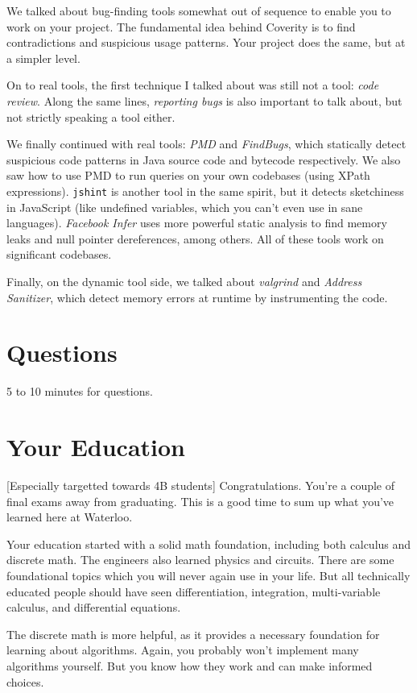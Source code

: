 \documentclass[11pt]{article}
\begin{document}
We talked about bug-finding tools somewhat out of sequence to enable
you to work on your project.  The fundamental idea behind Coverity is
to find contradictions and suspicious usage patterns. Your project
does the same, but at a simpler level.

On to real tools, the first technique I talked about was still not a tool:
\emph{code review}. Along the same lines, \emph{reporting bugs} is also important
to talk about, but not strictly speaking a tool either.

We finally continued with real tools: \emph{PMD} and \emph{FindBugs},
which statically detect suspicious code patterns in Java source code
and bytecode respectively. We also saw how to use PMD to run queries
on your own codebases (using XPath expressions). {\tt jshint} is another
tool in the same spirit, but it detects sketchiness in JavaScript
(like undefined variables, which you can't even use in sane languages).
\emph{Facebook Infer} uses more powerful static analysis to find memory
leaks and null pointer dereferences, among others. All of these tools
work on significant codebases.

Finally, on the dynamic tool side, we talked about \emph{valgrind}
and \emph{Address Sanitizer}, which detect memory errors at runtime
by instrumenting the code.

\section*{Questions}

5 to 10 minutes for questions.

\section*{Your Education}
[Especially targetted towards 4B students] Congratulations. You're a
couple of final exams away from graduating. This is a good time to sum
up what you've learned here at Waterloo.

Your education started with a solid math foundation, including both
calculus and discrete math. The engineers also learned physics and
circuits. There are some foundational topics which you will never
again use in your life. But all technically educated people should
have seen differentiation, integration, multi-variable calculus, and
differential equations.

The discrete math is more helpful, as it provides a necessary
foundation for learning about algorithms. Again, you probably won't
implement many algorithms yourself. But you know how they work and can
make informed choices.
\end{document}
